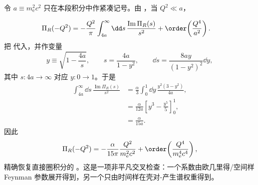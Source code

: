 \begin{derivation}
令 $a\equiv m_{\mathrm e}^2c^2$ 只在本段积分中作紧凑记号。由 ，当 $Q^2\ll a$，

\begin{align*}
 \Pi_R(-Q^2)
 &=-\frac{Q^2}{\pi}
 \int_{4a}^{\infty}\dd s\,
 \frac{\operatorname{Im}\Pi_R(s)}{s^2}
 +\order\!\left(\frac{Q^4}{a^2}\right).
 \end{align*}
把  代入，并作变量
\begin{equation*}
 y\equiv\sqrt{1-\frac{4a}{s}},
 \qquad
 s=\frac{4a}{1-y^2},
 \qquad
 \dd s=\frac{8ay}{(1-y^2)^2}\dd y,
\end{equation*}
其中 $s:4a\to\infty$ 对应 $y:0\to1$。于是
\begin{align*}
 \int_{4a}^{\infty}\dd s\,
 \frac{\operatorname{Im}\Pi_R(s)}{s^2}
 &=\frac{\alpha}{3}
 \int_0^1\dd y\,
 \frac{y^2(3-y^2)}{4a},\\
 &=\frac{\alpha}{12a}
 \left[y^3-\frac{y^5}{5}\right]_0^1,\\
 &=\frac{\alpha}{15a}.
\end{align*}
因此
\begin{equation*}
 {
 \Pi_R(-Q^2)
 =-\frac{\alpha}{15\pi}
 \frac{Q^2}{m_{\mathrm e}^2c^2}
 +\order\!\left(\frac{Q^4}{m_{\mathrm e}^4c^4}\right),}
 \end{equation*}
精确恢复直接圈积分的 。这是一项非平凡交叉检查：一个系数由欧几里得/空间样 Feynman 参数展开得到，另一个只由时间样在壳对-产生谱权重得到。
\end{derivation}

